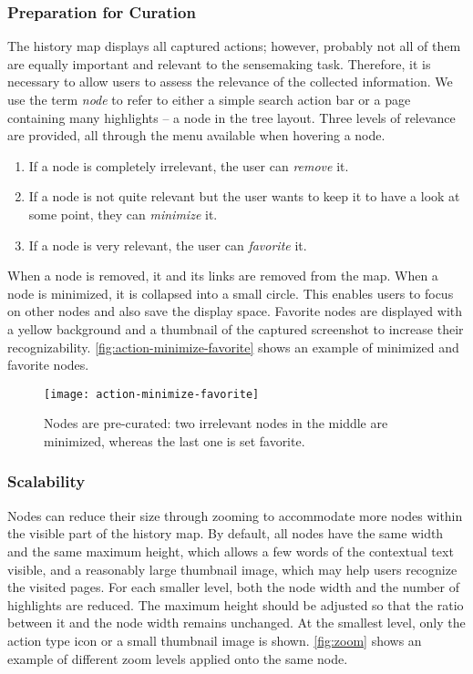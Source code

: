 \subsubsection{Preparation for Curation}
The history map displays all captured actions; however, probably not all of them are equally important and relevant to the sensemaking task. Therefore, it is necessary to allow users to assess the relevance of the collected information. We use the term \textit{node} to refer to either a simple search action bar or a page containing many highlights -- a node in the tree layout. Three levels of relevance are provided, all through the menu available when hovering a node.

\begin{enumerate}
	\item If a node is completely irrelevant, the user can \textit{remove} it.
	\item If a node is not quite relevant but the user wants to keep it to have a look at some point, they can \textit{minimize} it.
	\item If a node is very relevant, the user can \textit{favorite} it.
\end{enumerate}

When a node is removed, it and its links are removed from the map. When a node is minimized, it is collapsed into a small circle. This enables users to focus on other nodes and also save the display space. Favorite nodes are displayed with a yellow background and a thumbnail of the captured screenshot to increase their recognizability. \autoref{fig:action-minimize-favorite} shows an example of minimized and favorite nodes.

\begin{figure}[!htb]
	\centering
	\texttt{[image: action-minimize-favorite]}
	\caption{Nodes are pre-curated: two irrelevant nodes in the middle are minimized, whereas the last one is set favorite.}
	\label{fig:action-minimize-favorite}
\end{figure}

\subsubsection{Scalability}
Nodes can reduce their size through zooming to accommodate more nodes within the visible part of the history map. By default, all nodes have the same width and the same maximum height, which allows a few words of the contextual text visible, and a reasonably large thumbnail image, which may help users recognize the visited pages. For each smaller level, both the node width and the number of highlights are reduced. The maximum height should be adjusted so that the ratio between it and the node width remains unchanged. At the smallest level, only the action type icon or a small thumbnail image is shown. \autoref{fig:zoom} shows an example of different zoom levels applied onto the same node.

